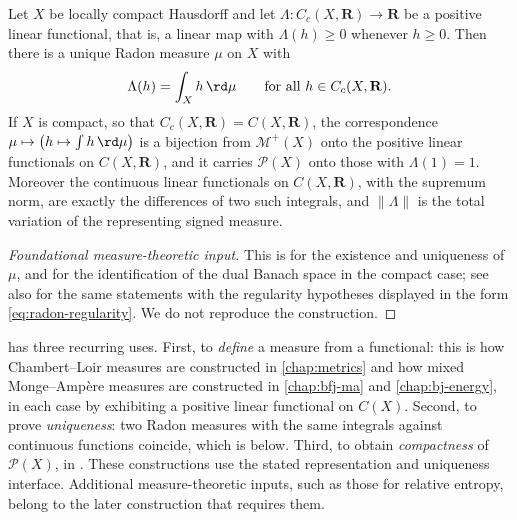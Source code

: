\begin{theorem}
\label{thm:riesz-interface}
Let $X$ be locally compact Hausdorff and let
$\Lambda:C_c(X,\mathbf R)\to\mathbf R$ be a positive linear functional, that is, a
linear map with $\Lambda(h)\geq0$ whenever $h\geq0$.  Then there is a unique
Radon measure $\mu$ on $X$ with
\begin{equation}
\label{eq:riesz}
 \Lambda(h)=\int_Xh\,\rd\mu\qquad\text{for all }h\in C_c(X,\mathbf R).
\end{equation}
If $X$ is compact, so that $C_c(X,\mathbf R)=C(X,\mathbf R)$, the correspondence
$\mu\mapsto\bigl(h\mapsto\int h\,\rd\mu\bigr)$ is a bijection from
$\mathcal M^+(X)$ onto the positive linear functionals on $C(X,\mathbf R)$, and it
carries $\mathcal P(X)$ onto those with $\Lambda(1)=1$.  Moreover the
continuous linear functionals on $C(X,\mathbf R)$, with the supremum norm, are exactly
the differences of two such integrals, and $\lVert\Lambda\rVert$ is the total
variation of the representing signed measure.
\end{theorem}

\begin{proof}[Foundational measure-theoretic input]
This is \cite[Theorem~2.14]{Rud87} for the existence and uniqueness of $\mu$,
and \cite[Theorem~6.19]{Rud87} for the identification of the dual Banach space
in the compact case; see also \cite[Chapter~7]{Fol99} for the same statements
with the regularity hypotheses displayed in the form
\eqref{eq:radon-regularity}.  We do not reproduce the construction.
\end{proof}

\begin{remark}
\label{rem:riesz-uses}
 has three recurring uses.  First, to
\emph{define} a measure from a functional: this is how Chambert--Loir measures
are constructed in \cref{chap:metrics} and how mixed Monge--Amp\`ere measures
are constructed in \cref{chap:bfj-ma} and \cref{chap:bj-energy}, in each case
by exhibiting a positive linear functional on $C(X)$.  Second, to prove
\emph{uniqueness}: two Radon measures with the same integrals against
continuous functions coincide, which is  below.
Third, to obtain \emph{compactness} of $\mathcal P(X)$, in
.  These constructions use the stated
representation and uniqueness interface.  Additional measure-theoretic
inputs, such as those for relative entropy, belong to the later construction
that requires them.
\end{remark}

